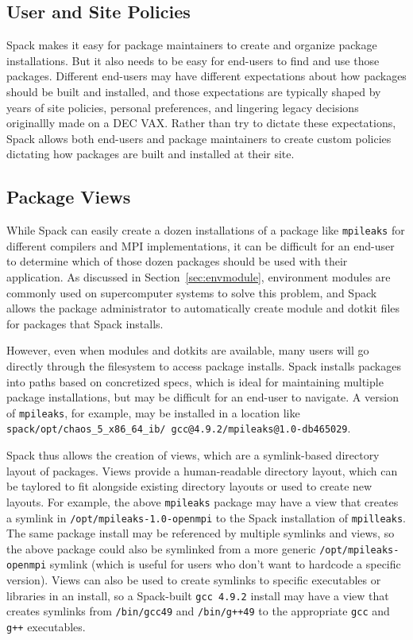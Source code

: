 
\subsection{User and Site Policies}
\label{sec:usecase-policy}

Spack makes it easy for package maintainers to create and organize package installations.  But it also needs to be easy for end-users to find and use those packages.  Different end-users may have different expectations about how packages should be built and installed, and those expectations are typically shaped by years of site policies, personal preferences, and lingering legacy decisions originallly made on a DEC VAX.  Rather than try to dictate these expectations, Spack allows both end-users and package maintainers to create custom policies dictating how packages are built and installed at their site.

\subsection{Package Views}
\label{sec:package-views}

While Spack can easily create a dozen installations of a package like {\tt mpileaks} for different compilers and MPI implementations, it can be difficult for an end-user to determine which of those dozen packages should be used with their application.  As discussed in Section~\ref{sec:envmodule}, environment modules are commonly used on supercomputer systems to solve this problem, and Spack allows the package administrator to automatically create module and dotkit files for packages that Spack installs.

However, even when modules and dotkits are available, many users will go directly through the filesystem to access package installs.  Spack installs packages into paths based on concretized specs, which is ideal for maintaining multiple package installations, but may be difficult for an end-user to navigate.  A version of {\tt mpileaks}, for example, may be installed in a location like {\tt spack/opt/chaos\_5\_x86\_64\_ib/ gcc@4.9.2/mpileaks@1.0-db465029}.

Spack thus allows the creation of views, which are a symlink-based directory layout of packages.  Views provide a human-readable directory layout, which can be taylored to fit alongside existing directory layouts or used to create new layouts.  For example, the above {\tt mpileaks} package may have a view that creates a symlink in {\tt /opt/mpileaks-1.0-openmpi} to the Spack installation of {\tt mpilleaks}.  The same package install may be referenced by multiple symlinks and views, so the above package could also be symlinked from a more generic {\tt /opt/mpileaks-openmpi} symlink (which is useful for users who don't want to hardcode a specific version).  Views can also be used to create symlinks to specific executables or libraries in an install, so a Spack-built {\tt gcc 4.9.2} install may have a view that creates symlinks from {\tt /bin/gcc49} and {\tt /bin/g++49} to the appropriate {\tt gcc} and {\tt g++} executables.

